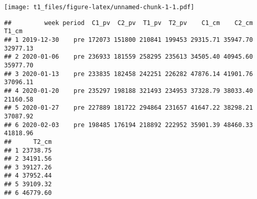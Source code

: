 \documentclass[
]{article}
\newenvironment{Shaded}{\begin{snugshade}}{\end{snugshade}}
\newcommand{\AttributeTok}[1]{\textcolor[rgb]{0.77,0.63,0.00}{#1}}
\newcommand{\CommentTok}[1]{\textcolor[rgb]{0.56,0.35,0.01}{\textit{#1}}}
\newcommand{\ConstantTok}[1]{\textcolor[rgb]{0.00,0.00,0.00}{#1}}
\newcommand{\DecValTok}[1]{\textcolor[rgb]{0.00,0.00,0.81}{#1}}
\newcommand{\DocumentationTok}[1]{\textcolor[rgb]{0.56,0.35,0.01}{\textbf{\textit{#1}}}}
\newcommand{\FunctionTok}[1]{\textcolor[rgb]{0.00,0.00,0.00}{#1}}
\newcommand{\NormalTok}[1]{#1}
\newcommand{\OtherTok}[1]{\textcolor[rgb]{0.56,0.35,0.01}{#1}}
\newcommand{\SpecialCharTok}[1]{\textcolor[rgb]{0.00,0.00,0.00}{#1}}
\newcommand{\StringTok}[1]{\textcolor[rgb]{0.31,0.60,0.02}{#1}}
\begin{document}
\texttt{[image: t1\_files/figure-latex/unnamed-chunk-1-1.pdf]}

\begin{Shaded}
\end{Shaded}

\begin{verbatim}
##         week period  C1_pv  C2_pv  T1_pv  T2_pv    C1_cm    C2_cm    T1_cm
## 1 2019-12-30    pre 172073 151800 210841 199453 29315.71 35947.70 32977.13
## 2 2020-01-06    pre 236933 181559 258295 235613 34505.40 40945.60 35977.70
## 3 2020-01-13    pre 233835 182458 242251 226282 47876.14 41901.76 37096.11
## 4 2020-01-20    pre 235297 198188 321493 234953 37328.79 38033.40 21160.58
## 5 2020-01-27    pre 227889 181722 294864 231657 41647.22 38298.21 37087.92
## 6 2020-02-03    pre 198485 176194 218892 222952 35901.39 48460.33 41818.96
##      T2_cm
## 1 23738.75
## 2 34191.56
## 3 39127.26
## 4 37952.44
## 5 39109.32
## 6 46779.60
\end{verbatim}
\end{document}
